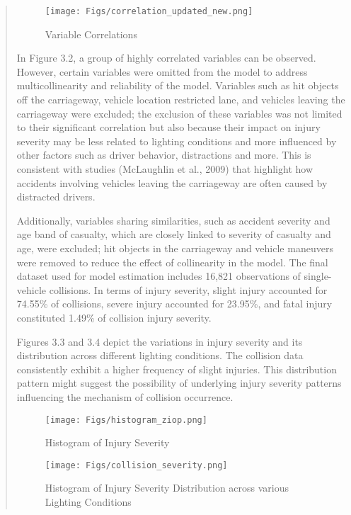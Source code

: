 \documentclass[12]{report}
\begin{document}
\begin{quote}
{\begin{figure}[H]
    \centering
    \texttt{[image: Figs/correlation\_updated\_new.png]}
    \caption{ Variable Correlations}
    \label{fig:enter-label}
\end{figure}

In Figure 3.2, a group of highly correlated variables can be observed. However, certain variables were omitted from the model to address multicollinearity and reliability of the model. Variables such as hit objects off the carriageway, vehicle location restricted lane, and vehicles leaving the carriageway were excluded; the exclusion of these variables was not limited to their significant correlation but also because their impact on injury severity may be less related to lighting conditions and more influenced by other factors such as driver behavior, distractions and more. This is consistent with studies (McLaughlin et al., 2009) that highlight how accidents involving vehicles leaving the carriageway are often caused by distracted drivers.

Additionally, variables sharing similarities, such as accident severity and age band of casualty, which are closely linked to severity of casualty and age, were excluded;  hit objects in the carriageway and vehicle maneuvers were removed to reduce the effect of collinearity in the model. The final dataset used for model estimation includes 16,821 observations of single-vehicle collisions. In terms of injury severity, slight injury accounted for  74.55\%  of collisions, severe injury accounted for 23.95\%, and fatal injury constituted 1.49\%  of collision injury severity.

\clearpage
Figures 3.3 and 3.4 depict the variations in injury severity and its distribution across different lighting conditions. The collision data consistently exhibit a higher frequency of slight injuries. This distribution pattern might suggest the possibility of underlying injury severity patterns influencing the mechanism of collision occurrence.

\begin{figure}[H]
    \centering
    \texttt{[image: Figs/histogram\_ziop.png]}
    \caption{ Histogram of Injury Severity}
\end{figure}

\begin{figure}[H]
    \centering
    \texttt{[image: Figs/collision\_severity.png]}
    \caption{Histogram of Injury Severity Distribution across various Lighting Conditions}
\end{figure}

}
\end{quote}
\end{document}
